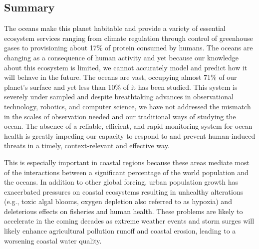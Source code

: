 \setcounter{secnumdepth}{0} 
\subsection{Summary}


The oceans make this planet habitable and provide a variety of
essential ecosystem services ranging from climate regulation through
control of greenhouse gases to provisioning about 17\% of protein
consumed by humans.  The oceans are changing as a consequence of human
activity and yet because our knowledge about this ecosystem is
limited, we cannot accurately model and predict how it will behave in
the future.  The oceans are vast, occupying almost 71\% of our
planet’s surface and yet less than 10\% of it has been studied.  This
system is severely under sampled and despite breathtaking advances in
observational technology, robotics, and computer science, we have not
addressed the mismatch in the scales of observation needed and our
traditional ways of studying the ocean.
The absence of a reliable, efficient, and rapid monitoring system for
ocean health is greatly impeding our capacity to respond to and
prevent human-induced threats in a timely, context-relevant and
effective way.

This is especially important in coastal regions because these areas
mediate most of the interactions between a significant percentage of
the world population and the oceans.  In addition to other global
forcing, urban population growth has exacerbated pressures on
coastal ecosystems resulting in unhealthy alterations (e.g., toxic
algal blooms, oxygen depletion also referred to as hypoxia) and
deleterious effects on fisheries and human health. These problems are
likely to accelerate in the coming decades as extreme weather events
and storm surges will likely enhance agricultural pollution runoff and
coastal erosion, leading to a worsening coastal water quality.

